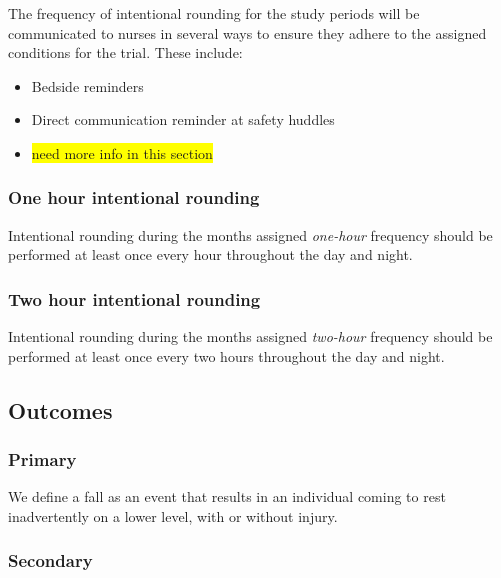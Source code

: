 \documentclass[12pt]{article}
\begin{document}
The frequency of intentional rounding for the study periods will be communicated to nurses in several ways to ensure they adhere to the assigned conditions for the trial. These include:
\begin{itemize}
    \item Bedside reminders
    \item Direct communication reminder at safety huddles
    \item \colorbox{yellow}{need more info in this section}
\end{itemize}


\subsubsection{One hour intentional rounding}
Intentional rounding during the months assigned \textit{one-hour} frequency should be performed at least once every hour throughout the day and night. 

\subsubsection{Two hour intentional rounding}
Intentional rounding during the months assigned \textit{two-hour} frequency should be performed at least once every two hours throughout the day and night. 

\subsection{Outcomes}

\subsubsection{Primary}
We define a fall as an event that results in an individual coming to rest inadvertently on a lower level, with or without injury.

\subsubsection{Secondary}
\end{document}
